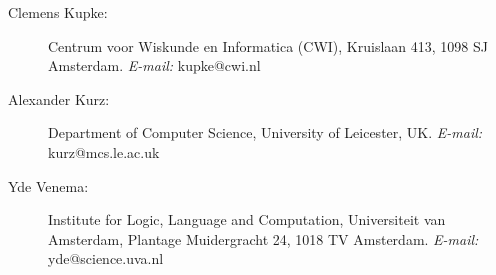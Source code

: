 \documentclass{book}
\begin{document}

\begin{description}
\item[\rm Clemens Kupke:]
Centrum voor Wiskunde en Informatica (CWI),
Kruislaan 413,
1098 SJ Amsterdam.
\emph{E-mail:} kupke@cwi.nl
\item[\rm Alexander Kurz:]
Department of Computer Science,
University of Leicester, UK.
\emph{E-mail:} kurz@mcs.le.ac.uk 
\item[\rm Yde Venema:]
Institute for Logic, Language and Computation,
Universiteit van Amsterdam,
Plantage Muidergracht 24,
1018 TV Amsterdam.
\emph{E-mail:} yde@science.uva.nl
\end{description}
\end{document}
